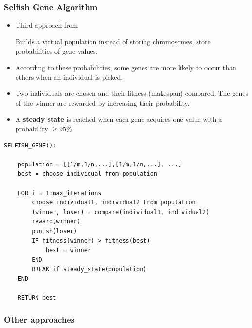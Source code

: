 \begin{frame}
  \frametitle{Selfish Gene Algorithm}

\begin{itemize}

	\item Third approach from \cite{Khuri}%

	\item [ Builds a virtual population ] instead of storing chromosomes, store probabilities of gene values.

	\item According to these probabilities, some genes are more likely to occur than others when an individual is picked.

	\item Two individuals are chosen and their fitness (makespan) compared. The genes of the winner are rewarded by increasing their probability.
	
	\item A \textbf{steady state} is reached when each gene acquires one value with a probability $\geq 95\%$
\end{itemize}

\end{frame}


\begin{frame}[fragile]
\vspace{-0.8cm}
{\scriptsize
\begin{verbatim}
SELFISH_GENE():
    
    population = [[1/m,1/n,...],[1/m,1/n,...], ...]
    best = choose individual from population
    
    FOR i = 1:max_iterations
        choose individual1, individual2 from population
        (winner, loser) = compare(individual1, individual2)
        reward(winner)
        punish(loser)
        IF fitness(winner) > fitness(best)
            best = winner
        END
        BREAK if steady_state(population)
    END
    
    RETURN best
\end{verbatim}}

\end{frame}

\begin{frame}
  \frametitle{Other approaches}
\end{frame}
